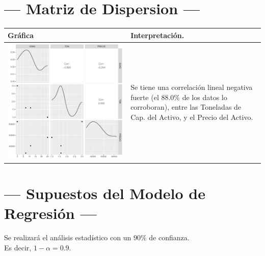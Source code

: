 \documentclass{article}
\begin{document}
\section{\centering --- Matriz de Dispersion ---} %
\begin{center}
  \begin{tabular}{|p{11cm}|p{5cm}|}
    \hline
    Gráfica & Interpretación. \\ \hline 
    \begin{minipage}{\textwidth}
    \includegraphics[width= 0.5 \linewidth, page=1]{r/Rplots.pdf}
    \end{minipage} 
    &
		Se tiene una correlación lineal negativa fuerte (el \(88.0\%\) de los datos lo corroboran),
		entre las Toneladas de Cap. del Activo, y el Precio del Activo.
		\\ \hline 
  \end{tabular}
\end{center} 

\newpage

\section{\centering --- Supuestos del Modelo de Regresión ---} %

Se realizará el análisis estadístico con un \(90\%\) de confianza. \\ 
Es decir, \(1- \alpha = 0.9\).
\end{document}
